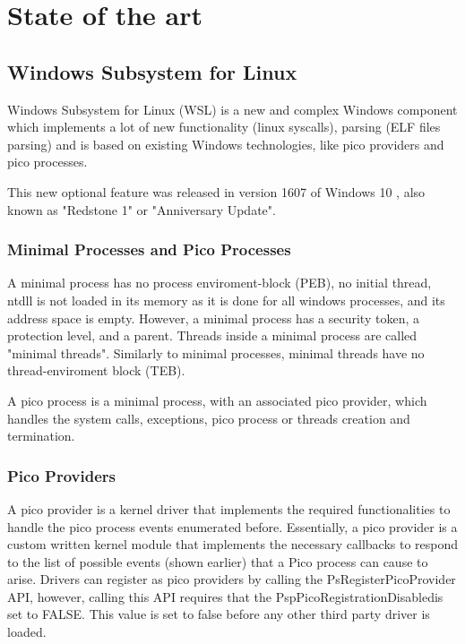 \chapter{State of the art}
    \section{Windows Subsystem for Linux}
    Windows Subsystem for Linux (WSL) is a new and complex Windows component which implements a lot of new functionality (linux syscalls),
    parsing (ELF files parsing) and is based on existing Windows technologies, like pico providers and pico processes.
    
    This new optional feature was released in version 1607 of Windows 10 \cite{WindowsInternals}, also known as "Redstone 1" or
    "Anniversary Update".

        \subsection{Minimal Processes and Pico Processes}
            A minimal process has no process enviroment-block (PEB), no initial thread, ntdll is not loaded in its memory as it is done
            for all windows processes, and its address space is empty. However, a minimal process has a security token, a protection level,
            and a parent. Threads inside a minimal process are called "minimal threads". Similarly to minimal processes, minimal threads
            have no thread-enviroment block (TEB).

            A pico process is a minimal process, with an associated pico provider, which handles the system calls, exceptions, pico process
            or threads creation and termination.    

        \subsection{Pico Providers}
            A pico provider is a kernel driver that implements the required functionalities to handle the pico process events enumerated before.
            Essentially, a pico provider is a custom written kernel module that implements the necessary callbacks to respond to the list of
            possible events (shown earlier) that a Pico process can cause to arise\cite{WindowsInternals}. Drivers can register as pico providers by calling the
            PsRegisterPicoProvider API, however, calling this API requires that the PspPicoRegistrationDisabledis set to FALSE. This value is
            set to false before any other third party driver is loaded.
            
